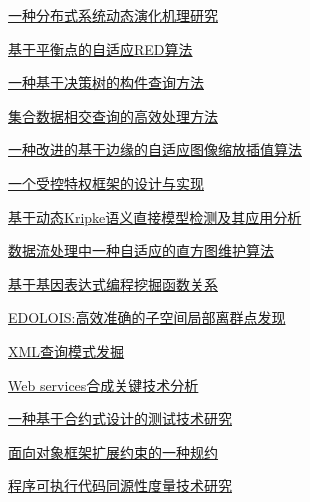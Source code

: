 \documentclass[a4paper]{article}
\begin{document}
\href{http://www.jos.org.cn/ch/reader/download_pdf.aspx?file_no=2004s104&year_id=2004&quarter_id=zk&falg=1}{一种分布式系统动态演化机理研究}

\href{http://www.jos.org.cn/ch/reader/download_pdf.aspx?file_no=2004s105&year_id=2004&quarter_id=zk&falg=1}{基于平衡点的自适应RED算法}

\href{http://www.jos.org.cn/ch/reader/download_pdf.aspx?file_no=2004s106&year_id=2004&quarter_id=zk&falg=1}{一种基于决策树的构件查询方法}

\href{http://www.jos.org.cn/ch/reader/download_pdf.aspx?file_no=2004s107&year_id=2004&quarter_id=zk&falg=1}{集合数据相交查询的高效处理方法}

\href{http://www.jos.org.cn/ch/reader/download_pdf.aspx?file_no=2004s108&year_id=2004&quarter_id=zk&falg=1}{一种改进的基于边缘的自适应图像缩放插值算法}

\href{http://www.jos.org.cn/ch/reader/download_pdf.aspx?file_no=2004s109&year_id=2004&quarter_id=zk&falg=1}{一个受控特权框架的设计与实现}

\href{http://www.jos.org.cn/ch/reader/download_pdf.aspx?file_no=2004s110&year_id=2004&quarter_id=zk&falg=1}{基于动态Kripke语义直接模型检测及其应用分析}

\href{http://www.jos.org.cn/ch/reader/download_pdf.aspx?file_no=2004s111&year_id=2004&quarter_id=zk&falg=1}{数据流处理中一种自适应的直方图维护算法}

\href{http://www.jos.org.cn/ch/reader/download_pdf.aspx?file_no=2004s112&year_id=2004&quarter_id=zk&falg=1}{基于基因表达式编程挖掘函数关系}

\href{http://www.jos.org.cn/ch/reader/download_pdf.aspx?file_no=2004s113&year_id=2004&quarter_id=zk&falg=1}{EDOLOIS:高效准确的子空间局部离群点发现}

\href{http://www.jos.org.cn/ch/reader/download_pdf.aspx?file_no=2004s114&year_id=2004&quarter_id=zk&falg=1}{XML查询模式发掘}

\href{http://www.jos.org.cn/ch/reader/download_pdf.aspx?file_no=2004s115&year_id=2004&quarter_id=zk&falg=1}{Web services合成关键技术分析}

\href{http://www.jos.org.cn/ch/reader/download_pdf.aspx?file_no=2004s116&year_id=2004&quarter_id=zk&falg=1}{一种基于合约式设计的测试技术研究}

\href{http://www.jos.org.cn/ch/reader/download_pdf.aspx?file_no=2004s117&year_id=2004&quarter_id=zk&falg=1}{面向对象框架扩展约束的一种规约}

\href{http://www.jos.org.cn/ch/reader/download_pdf.aspx?file_no=2004s118&year_id=2004&quarter_id=zk&falg=1}{程序可执行代码同源性度量技术研究}
\end{document}
